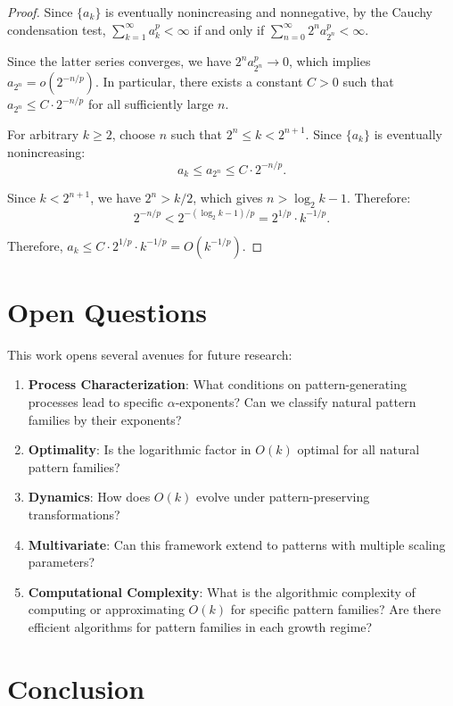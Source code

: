 \documentclass[11pt]{article}
\theoremstyle{definition}
\begin{document}
\begin{proof}
Since $\{a_k\}$ is eventually nonincreasing and nonnegative, by the Cauchy condensation test, $\sum_{k=1}^\infty a_k^p < \infty$ if and only if $\sum_{n=0}^\infty 2^n a_{2^n}^p < \infty$.

Since the latter series converges, we have $2^n a_{2^n}^p \to 0$, which implies $a_{2^n} = o(2^{-n/p})$. In particular, there exists a constant $C > 0$ such that $a_{2^n} \leq C \cdot 2^{-n/p}$ for all sufficiently large $n$.

For arbitrary $k \geq 2$, choose $n$ such that $2^n \leq k < 2^{n+1}$. Since $\{a_k\}$ is eventually nonincreasing:
$$a_k \leq a_{2^n} \leq C \cdot 2^{-n/p}.$$

Since $k < 2^{n+1}$, we have $2^n > k/2$, which gives $n > \log_2 k - 1$. Therefore:
$$2^{-n/p} < 2^{-(\log_2 k - 1)/p} = 2^{1/p} \cdot k^{-1/p}.$$

Therefore, $a_k \leq C \cdot 2^{1/p} \cdot k^{-1/p} = O(k^{-1/p})$.
\end{proof}

\section{Open Questions}

This work opens several avenues for future research:

\begin{enumerate}
\item \textbf{Process Characterization}: What conditions on pattern-generating processes lead to specific $\alpha$-exponents? Can we classify natural pattern families by their exponents?
\item \textbf{Optimality}: Is the logarithmic factor in $O(k)$ optimal for all natural pattern families?
\item \textbf{Dynamics}: How does $O(k)$ evolve under pattern-preserving transformations?
\item \textbf{Multivariate}: Can this framework extend to patterns with multiple scaling parameters?
\item \textbf{Computational Complexity}: What is the algorithmic complexity of computing or approximating $O(k)$ for specific pattern families? Are there efficient algorithms for pattern families in each growth regime?
\end{enumerate}

\section{Conclusion}
\end{document}

